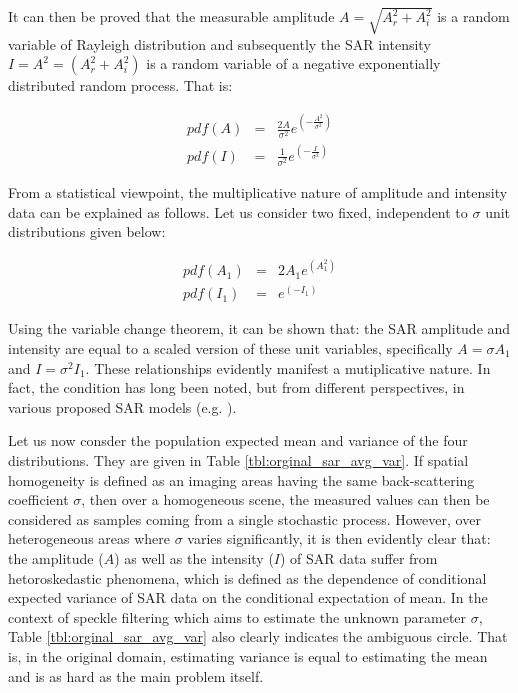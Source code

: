 It can then be proved that the measurable amplitude $A=\sqrt{A_r^2+A_i^2}$ is a random variable of Rayleigh distribution
  and subsequently the SAR intensity $I=A^2=(A_r^2+A_i^2)$ is a random variable of a negative exponentially distributed random process.
That is:

\begin{eqnarray}
pdf(A) &=& \frac{2A}{\sigma^2}e^{ \left( -\frac{A^2}{\sigma^2} \right) }\\
pdf(I) &=& \frac{1}{\sigma^2}e^{\left( -\frac{I}{\sigma^2} \right) }
\end{eqnarray}

From a statistical viewpoint, the multiplicative nature of amplitude and intensity data can be explained as follows. 
Let us consider two fixed, independent to $\sigma$ unit distributions given below:

\begin{eqnarray}
pdf(A_1) &=& 2A_1 e^{ \left( A_1^2 \right) }\\
pdf(I_1) &=& e^{ \left( -I_1 \right) }
\end{eqnarray}

Using the variable change theorem,
    it can be shown that:
    the SAR amplitude and intensity are equal to %
    a scaled version of these unit variables,
    specifically $A= \sigma A_1 $ and $I= \sigma^2 I_1 $. 
These relationships evidently manifest a mutiplicative nature. 
In fact, the condition has long been noted,
  but from different perspectives,
  in various proposed SAR models (e.g. \cite{Jakeman_1980_JPhysAMathGen}).

Let us now consder the population expected mean and variance of the four distributions.
They are given in Table \ref{tbl:orginal_sar_avg_var}. 
If spatial homogeneity is defined as an imaging areas having the same back-scattering coefficient $\sigma$,
  then over a homogeneous scene, the measured values can then be considered as samples coming from a single stochastic process.
However, over heterogeneous areas where $\sigma$ varies significantly,
  it is then evidently clear that: the amplitude ($A$) as well as the intensity ($I$) of SAR data suffer from hetoroskedastic phenomena,
  which is defined as the dependence of conditional expected variance of SAR data on the conditional expectation of mean. 
In the context of speckle filtering which aims to estimate the unknown parameter $\sigma$,
  Table \ref{tbl:orginal_sar_avg_var} also clearly indicates the ambiguous circle.
That is, in the original domain, estimating variance is equal to estimating the mean
  and is as hard as the main problem itself.

